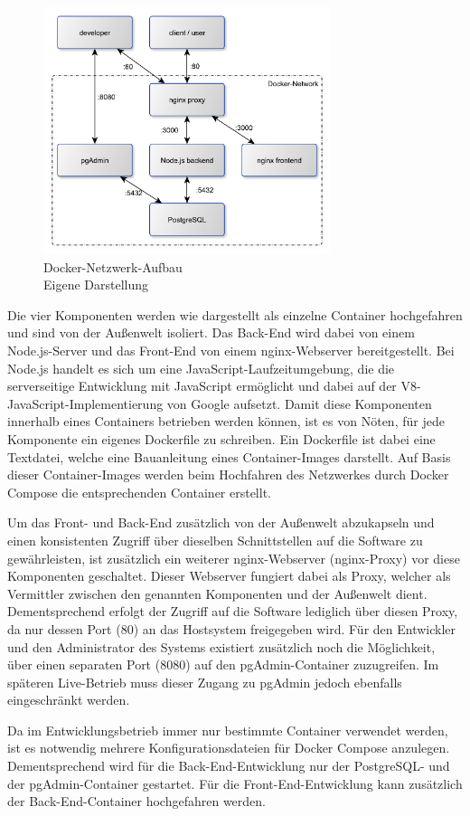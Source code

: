 \begin{figure}[H]
	\centering
	\includegraphics[width=0.75\textwidth]{img/implementierung/network.pdf}
	\captionsetup{justification=centering, format=plain}
	\caption[Docker-Netzwerk-Aufbau]{Docker-Netzwerk-Aufbau \\ \quelle Eigene Darstellung}
	\label{fig:implementierung:docker}
\end{figure}

Die vier Komponenten werden wie dargestellt als einzelne Container hochgefahren und sind von der Außenwelt isoliert.
Das Back-End wird dabei von einem Node.js-Server und das Front-End von einem nginx-Webserver bereitgestellt.
Bei Node.js handelt es sich um eine JavaScript-Laufzeitumgebung, die die serverseitige Entwicklung mit JavaScript ermöglicht und dabei auf der V8-JavaScript-Implementierung von Google aufsetzt.\autocite[Vgl.][]{nl-openjsfoundation2020nodejs}
Damit diese Komponenten innerhalb eines Containers betrieben werden können, ist es von Nöten, für jede Komponente ein eigenes Dockerfile zu schreiben.
Ein Dockerfile ist dabei eine Textdatei, welche eine Bauanleitung eines Container-Images darstellt.
Auf Basis dieser Container-Images werden beim Hochfahren des Netzwerkes durch Docker Compose die entsprechenden Container erstellt.

Um das Front- und Back-End zusätzlich von der Außenwelt abzukapseln und einen konsistenten Zugriff über dieselben Schnittstellen auf die Software zu gewährleisten, ist zusätzlich ein weiterer nginx-Webserver (nginx-Proxy) vor diese Komponenten geschaltet.
Dieser Webserver fungiert dabei als Proxy, welcher als Vermittler zwischen den genannten Komponenten und der Außenwelt dient.
Dementsprechend erfolgt der Zugriff auf die Software lediglich über diesen Proxy, da nur dessen Port (80) an das Hostsystem freigegeben wird.
Für den Entwickler und den Administrator des Systems existiert zusätzlich noch die Möglichkeit, über einen separaten Port (8080) auf den pgAdmin-Container zuzugreifen.
Im späteren Live-Betrieb muss dieser Zugang zu pgAdmin jedoch ebenfalls eingeschränkt werden.

Da im Entwicklungsbetrieb immer nur bestimmte Container verwendet werden, ist es notwendig mehrere Konfigurationsdateien für Docker Compose anzulegen.
Dementsprechend wird für die Back-End-Entwicklung nur der PostgreSQL- und der pgAdmin-Container gestartet.
Für die Front-End-Entwicklung kann zusätzlich der Back-End-Container hochgefahren werden.
